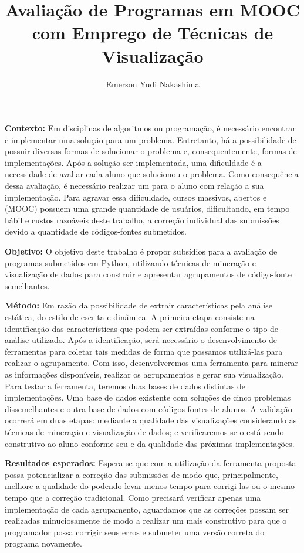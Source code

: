 \documentclass[12pt,english,brazil,a4paper,utf8,oneside]{utfpr-tcc}
\author{Emerson Yudi Nakashima}  %
\title{Avaliação de Programas em MOOC com Emprego de Técnicas de Visualização} %
\begin{document}
	
\frontmatter
\maketitle

\begin{resumo}
\textbf{Contexto:} Em disciplinas de algoritmos ou programação, é necessário encontrar
e implementar uma solução para um problema. Entretanto, há a possibilidade de possuir
diversas formas de solucionar o problema e, consequentemente, formas de implementações.
Após a solução ser implementada, uma dificuldade é a necessidade de avaliar cada aluno
que solucionou o problema. Como consequência dessa avaliação, é necessário realizar um
 para o aluno com relação a sua implementação. Para agravar essa
dificuldade, cursos massivos, abertos e  (MOOC) possuem uma grande
quantidade de usuários, dificultando, em tempo hábil e custos razoáveis deste
trabalho, a correção individual das submissões devido a quantidade de códigos-fontes submetidos.

\textbf{Objetivo:} O objetivo deste trabalho é propor subsídios para a avaliação de
programas submetidos em Python, utilizando técnicas de mineração e visualização de
dados para construir e apresentar agrupamentos de código-fonte semelhantes.

\textbf{Método:} Em razão da possibilidade de extrair características pela análise
estática, do estilo de escrita e dinâmica. A primeira etapa consiste na identificação
das características que podem ser extraídas conforme o tipo de análise utilizado.
Após a identificação, será necessário o desenvolvimento de ferramentas para coletar
tais medidas de forma que possamos utilizá-las para realizar o agrupamento. Com isso,
desenvolveremos uma ferramenta para minerar as informações disponíveis, realizar os
agrupamentos e gerar sua visualização. Para testar a ferramenta, teremos duas bases
de dados distintas de implementações. Uma base de dados existente com soluções de
cinco problemas dissemelhantes e outra base de dados com códigos-fontes de alunos.
A validação ocorrerá em duas etapas: mediante a qualidade das visualizações
considerando as técnicas de mineração e visualização de dados; e verificaremos se
o  está sendo construtivo ao aluno conforme seu 
e da qualidade das próximas implementações.

\textbf{Resultados esperados:} Espera-se que com a utilização da ferramenta proposta
possa potencializar a correção das submissões de modo que, principalmente, melhore
a qualidade do  podendo levar menos tempo para corrigi-las ou o
mesmo tempo que a correção tradicional. Como precisará verificar apenas uma
implementação de cada agrupamento, aguardamos que as correções possam ser realizadas
minuciosamente de modo a realizar um  mais construtivo para que o
programador possa corrigir seus erros e submeter uma versão correta do programa novamente.


\end{resumo}
\end{document}
